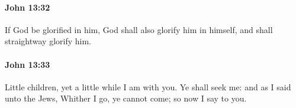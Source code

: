 		\paragraph{John 13:32} %
			\label{JOHN-13-32}

			If God be glorified in him, God shall also glorify him in himself, and shall straightway glorify him.

			\begin{framed}
				\scriptsize
				\begin{compactdesc}
					\item[SBLG] 
				\end{compactdesc}
			\end{framed}

		\paragraph{John 13:33} %
			\label{JOHN-13-33}

			Little children, yet a little while I am with you. Ye shall seek me: and as I said unto the Jews, Whither I go, ye cannot come; so now I say to you.

